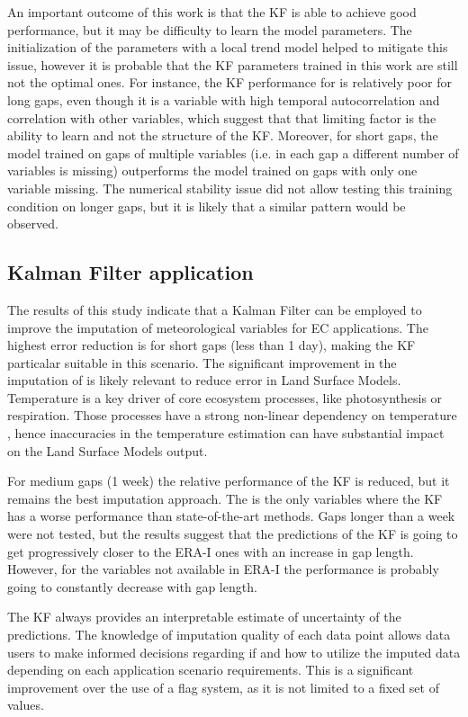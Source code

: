 \documentclass{article}
\let\Oldsubsection\subsection
\renewcommand{\subsection}{\FloatBarrier\Oldsubsection}
\begin{document}
An important outcome of this work is that the KF is able to achieve good performance, but it may be difficulty to learn the  model parameters. The initialization of the parameters with a local trend model helped to mitigate this issue, however it is probable that the KF parameters trained in this work are still not the optimal ones. For instance, the KF performance for  is relatively poor for long gaps, even though it is a variable with high temporal autocorrelation and correlation with other variables, which suggest that that limiting factor is the ability to learn and not the structure of the KF. Moreover, for short gaps, the model trained on gaps of multiple variables (i.e. in each gap a different number of variables is missing) outperforms the model trained on gaps with only one variable missing. The numerical stability issue did not allow testing this training condition on longer gaps, but it is likely that a similar pattern would be observed.


\subsection{Kalman Filter application}

The results of this study indicate that a Kalman Filter can be employed to improve the imputation of meteorological variables for EC applications.
The highest error reduction is for short gaps (less than 1 day), making the KF particalar suitable in this scenario. The significant improvement in the imputation of  is likely relevant to reduce error in Land Surface Models. Temperature is a key driver of core ecosystem processes, like photosynthesis or respiration. Those processes have a strong non-linear dependency on temperature \cite{bonan_climate_2019-2}, hence inaccuracies in the temperature estimation can have substantial impact on the Land Surface Models output.

For medium gaps (1 week) the relative performance of the KF is reduced, but it remains the best imputation approach. The  is the only variables where the KF has a worse performance than state-of-the-art methods.
Gaps longer than a week were not tested, but the results suggest that the predictions of the KF is going to get progressively closer to the ERA-I ones with an increase in gap length. However, for the variables not available in ERA-I the performance is probably going to constantly decrease with gap length.

The KF always provides an interpretable estimate of uncertainty of the predictions. The knowledge of imputation quality of each data point allows data users to make informed decisions regarding if and how to utilize the imputed data depending on each application scenario requirements. This is a significant improvement over the use of a flag system, as it is not limited to a fixed set of values.
\end{document}
